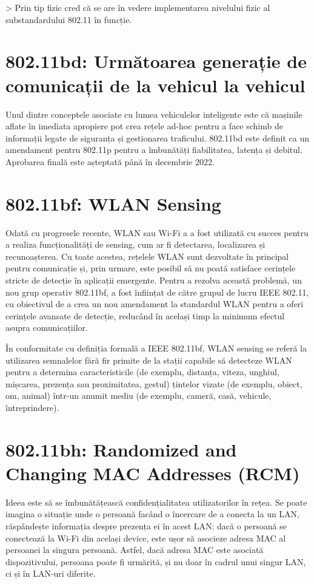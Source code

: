 \documentclass[a4paper,12pt]{report}
\begin{document}
> Prin tip fizic cred că se are în vedere implementarea nivelului fizic al substandardului 802.11 în funcție.

\section{802.11bd: Următoarea generație de comunicații de la vehicul la vehicul}

Unul dintre conceptele asociate cu lumea vehiculelor inteligente este că mașinile aflate în imediata apropiere pot crea rețele ad-hoc pentru a face schimb de informații legate de siguranța și gestionarea traficului.
802.11bd este definit ca un amendament pentru 802.11p pentru a îmbunătăți fiabilitatea, latența și debitul.
Aprobarea finală este așteptată până în decembrie 2022.

\section{802.11bf: WLAN Sensing}

Odată cu progresele recente, WLAN sau Wi-Fi a a fost utilizată cu succes pentru a realiza funcționalități de sensing, cum ar fi detectarea, localizarea și recunoașterea.
Cu toate acestea, rețelele WLAN sunt dezvoltate în principal pentru comunicație și, prin urmare, este posibil să nu poată satisface cerințele stricte de detecție în aplicații emergente.
Pentru a rezolva această problemă, un nou grup operativ 802.11bf, a fost înființat de către grupul de lucru IEEE 802.11, cu obiectivul de a crea un nou amendament la standardul WLAN pentru a oferi cerințele avansate de detecție, reducând în același timp la minimum efectul asupra comunicațiilor.

În conformitate cu definiția formală a IEEE 802.11bf, WLAN sensing se referă la utilizarea semnalelor fără fir primite de la stații capabile să detecteze WLAN pentru a determina caracteristicile (de exemplu, distanța, viteza, unghiul, mișcarea, prezența sau proximitatea, gestul) țintelor vizate (de exemplu, obiect, om, animal) într-un anumit mediu (de exemplu, cameră, casă, vehicule, întreprindere).

\section{802.11bh: Randomized and Changing MAC Addresses (RCM)}

Ideea este să se îmbunătățească confidențialitatea utilizatorilor în rețea.
Se poate imagina o situație unde o persoană facând o încercare de a conecta la un LAN, răspândește informația despre prezența ei în acest LAN: dacă o persoană se conectează la Wi-Fi din același device, este ușor să asocieze adresa MAC al persoanei la singura persoană.
Astfel, dacă adresa MAC este asociată dispozitivului, persoana poate fi urmărită, și nu doar în cadrul unui singur LAN, ci și în LAN-uri diferite. 
\end{document}
